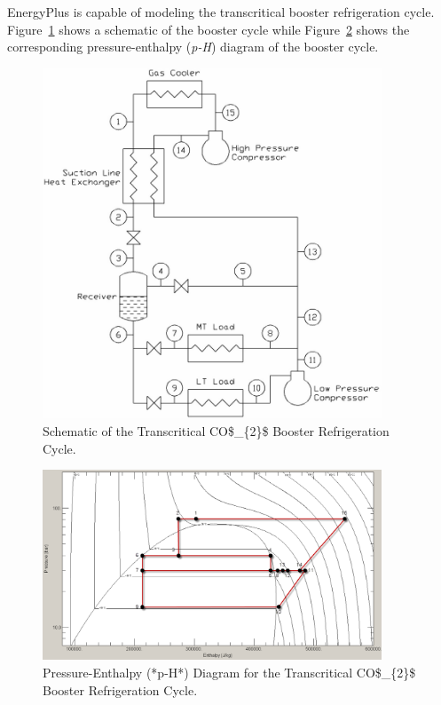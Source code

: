 EnergyPlus is capable of modeling the transcritical booster refrigeration cycle. Figure~\ref{fig:schematic-of-the-transcritical-co_2-booster} shows a schematic of the booster cycle while Figure~\ref{fig:pressure-enthalpy-p-h-diagram-for} shows the corresponding pressure-enthalpy (\emph{p-H}) diagram of the booster cycle.

\begin{figure}[hbtp] %
\centering
\includegraphics[width=0.9\textwidth, height=0.9\textheight, keepaspectratio=true]{media/image6337.png}
\caption{Schematic of the Transcritical CO\$\_\{2\}\$ Booster Refrigeration Cycle. \protect \label{fig:schematic-of-the-transcritical-co_2-booster}}
\end{figure}

\begin{figure}[hbtp] %
\centering
\includegraphics[width=0.9\textwidth, height=0.9\textheight, keepaspectratio=true]{media/image6338.png}
\caption{Pressure-Enthalpy (*p-H*) Diagram for the Transcritical CO\$\_\{2\}\$ Booster Refrigeration Cycle. \protect \label{fig:pressure-enthalpy-p-h-diagram-for}}
\end{figure}

